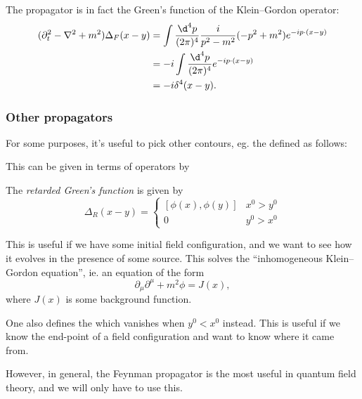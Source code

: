 \documentclass[a4paper]{article}
\begin{document}
The propagator is in fact the Green's function of the Klein--Gordon operator:
\begin{align*}
  (\partial_t^2 - \nabla^2 + m^2) \Delta_F(x - y) &= \int \frac{\d^4 p}{(2\pi)^4} \frac{i}{p^2 - m^2}(-p^2 + m^2) e^{-ip\cdot(x - y)}\\
  &= -i \int \frac{\d^4 p}{(2\pi)^4} e^{-ip\cdot(x - y)}\\
  &= -i \delta^4(x - y).
\end{align*}

\subsubsection*{Other propagators}
For some purposes, it's useful to pick other contours, eg. the  defined as follows:
\begin{center}
\end{center}
This can be given in terms of operators by
\begin{defi}
  The \emph{retarded Green's function} is given by
  \[
    \Delta_R(x - y) =
    \begin{cases}
      [\phi(x), \phi(y)]& x^0 > y^0\\
      0 & y^0 > x^0
    \end{cases}
  \]
\end{defi}
This is useful if we have some initial field configuration, and we want to see how it evolves in the presence of some source. This solves the ``inhomogeneous Klein--Gordon equation'', ie. an equation of the form
\[
  \partial_\mu \partial^\mu + m^2 \phi = J(x),
\]
where $J(x)$ is some background function.

One also defines the  which vanishes when $y^0 < x^0$ instead. This is useful if we know the end-point of a field configuration and want to know where it came from.

However, in general, the Feynman propagator is the most useful in quantum field theory, and we will only have to use this.
\end{document}
